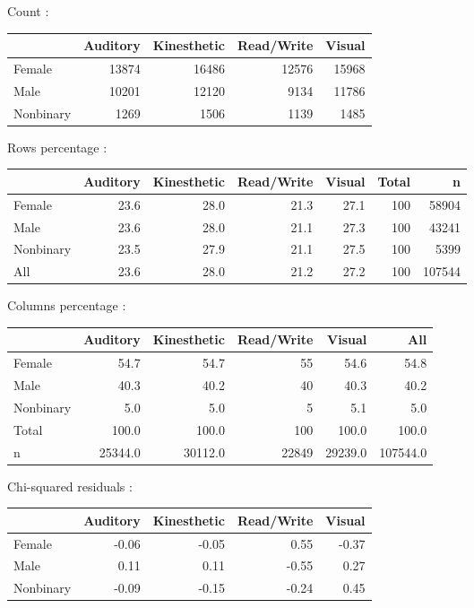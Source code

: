 \documentclass[
  twocolumn]{article}
\begin{document}
Count :

\begin{longtable}[]{@{}lrrrr@{}}
\toprule\noalign{}
& Auditory & Kinesthetic & Read/Write & Visual \\
\midrule\noalign{}
\endhead
\bottomrule\noalign{}
\endlastfoot
Female & 13874 & 16486 & 12576 & 15968 \\
Male & 10201 & 12120 & 9134 & 11786 \\
Nonbinary & 1269 & 1506 & 1139 & 1485 \\
\end{longtable}

Rows percentage :

\begin{longtable}[]{@{}lrrrrrr@{}}
\toprule\noalign{}
& Auditory & Kinesthetic & Read/Write & Visual & Total & n \\
\midrule\noalign{}
\endhead
\bottomrule\noalign{}
\endlastfoot
Female & 23.6 & 28.0 & 21.3 & 27.1 & 100 & 58904 \\
Male & 23.6 & 28.0 & 21.1 & 27.3 & 100 & 43241 \\
Nonbinary & 23.5 & 27.9 & 21.1 & 27.5 & 100 & 5399 \\
All & 23.6 & 28.0 & 21.2 & 27.2 & 100 & 107544 \\
\end{longtable}

Columns percentage :

\begin{longtable}[]{@{}lrrrrr@{}}
\toprule\noalign{}
& Auditory & Kinesthetic & Read/Write & Visual & All \\
\midrule\noalign{}
\endhead
\bottomrule\noalign{}
\endlastfoot
Female & 54.7 & 54.7 & 55 & 54.6 & 54.8 \\
Male & 40.3 & 40.2 & 40 & 40.3 & 40.2 \\
Nonbinary & 5.0 & 5.0 & 5 & 5.1 & 5.0 \\
Total & 100.0 & 100.0 & 100 & 100.0 & 100.0 \\
n & 25344.0 & 30112.0 & 22849 & 29239.0 & 107544.0 \\
\end{longtable}

Chi-squared residuals :

\begin{longtable}[]{@{}lrrrr@{}}
\toprule\noalign{}
& Auditory & Kinesthetic & Read/Write & Visual \\
\midrule\noalign{}
\endhead
\bottomrule\noalign{}
\endlastfoot
Female & -0.06 & -0.05 & 0.55 & -0.37 \\
Male & 0.11 & 0.11 & -0.55 & 0.27 \\
Nonbinary & -0.09 & -0.15 & -0.24 & 0.45 \\
\end{longtable}
\end{document}
